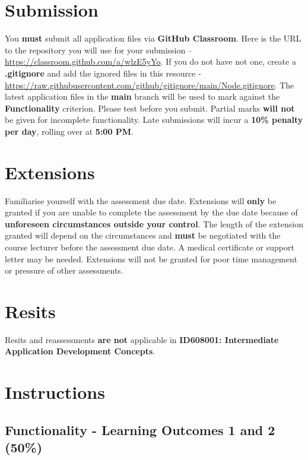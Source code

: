 \documentclass{article}
\begin{document}
\section*{Submission}
You \textbf{must} submit all application files via \textbf{GitHub Classroom}. Here is the URL to the repository you will use for your submission – \href{https://classroom.github.com/a/wlzE5yYo}{https://classroom.github.com/a/wlzE5yYo}. If you do not have not one, create a \textbf{.gitignore} and add the ignored files in this resource - \href{https://raw.githubusercontent.com/github/gitignore/main/Node.gitignore}{https://raw.githubusercontent.com/github/gitignore/main/Node.gitignore}. The latest application files in the \textbf{main} branch will be used to mark against the \textbf{Functionality} criterion. Please test before you submit. Partial marks \textbf{will not} be given for incomplete functionality. Late submissions will incur a \textbf{10\% penalty per day}, rolling over at \textbf{5:00 PM}.

\section*{Extensions}
Familiarise yourself with the assessment due date. Extensions will \textbf{only} be granted if you are unable to complete the assessment by the due date because of \textbf{unforeseen circumstances outside your control}. The length of the extension granted will depend on the circumstances and \textbf{must} be negotiated with the course lecturer before the assessment due date. A medical certificate or support letter may be needed. Extensions will not be granted for poor time management or pressure of other assessments.

\section*{Resits}
Resits and reassessments \textbf{are not} applicable in \textbf{ID608001: Intermediate Application Development Concepts}.

\section*{Instructions}

\subsection*{Functionality - Learning Outcomes 1 and 2 (50\%)}
\begin{itemize} 

\end{itemize}
\end{document}
